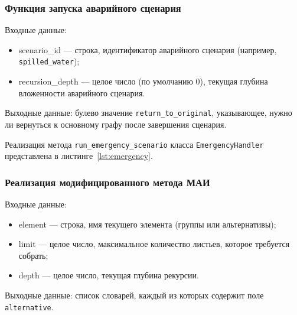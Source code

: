 \clearpage
\subsubsection{Функция запуска аварийного сценария}

Входные данные:
\begin{itemize}
    \item scenario\_id --- строка, идентификатор аварийного сценария (например, \texttt{spilled\_water});
    \item recursion\_depth --- целое число (по умолчанию 0), текущая глубина вложенности аварийного сценария.
\end{itemize}

Выходные данные: булево значение \texttt{return\_to\_original}, указывающее, нужно ли вернуться к основному графу после завершения сценария.

Реализация метода \texttt{run\_emergency\_scenario} класса \texttt{EmergencyHandler} представлена в листинге~\ref{lst:emergency}.


\subsubsection{Реализация модифицированного метода МАИ}

Входные данные:
\begin{itemize}
    \item element --- строка, имя текущего элемента (группы или альтернативы);
    \item limit --- целое число, максимальное количество листьев, которое требуется собрать;
    \item depth --- целое число, текущая глубина рекурсии.
\end{itemize}

Выходные данные: список словарей, каждый из которых содержит поле \texttt{alternative}.

